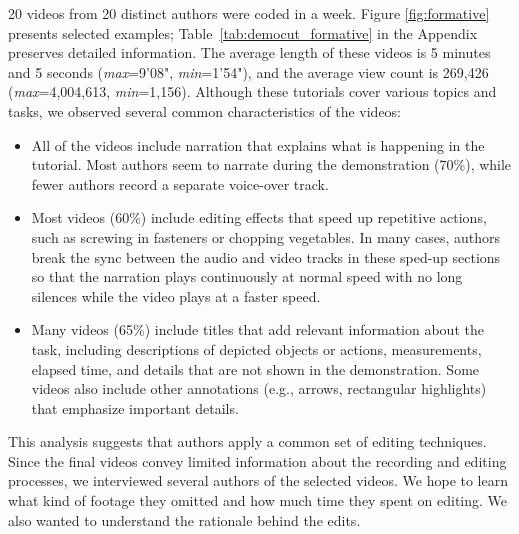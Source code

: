 20 videos from 20 distinct authors were coded in a week. Figure \ref{fig:formative} presents selected examples; Table~\ref{tab:democut_formative} in the Appendix preserves detailed information.
The average length of these videos is 5 minutes and 5 seconds (\emph{max}=9'08",
\emph{min}=1'54"), and the average view count is 269,426
(\emph{max}=4,004,613, \emph{min}=1,156). Although these tutorials
cover various topics and tasks, we observed several common
characteristics of the videos:

\begin{itemize}
  \setlength{\itemsep}{0pt}

\item {} All of the videos include narration that
  explains what is happening in the tutorial. Most authors seem to
  narrate during the demonstration (70\%), while fewer authors record a
  separate voice-over track.

\item {} Most videos (60\%) include editing
  effects that speed up repetitive actions, such as screwing in
  fasteners or chopping vegetables. In many cases, authors break the
  sync between the audio and video tracks in these sped-up sections so
  that the narration plays continuously at normal speed with no long
  silences while the video plays at a faster speed.

\item {} Many videos (65\%) include titles
  that add relevant information about the task, including descriptions
  of depicted objects or actions, measurements, elapsed time, and
  details that are not shown in the demonstration. Some videos also
  include other annotations (e.g., arrows, rectangular highlights)
  that emphasize important details.

\end{itemize}

This analysis suggests that authors apply a common set of editing
techniques. Since the final videos convey limited information
about the recording and editing processes, we
interviewed several authors of the selected videos.
We hope to learn what kind of footage they omitted and how much time they spent on editing. We also wanted to understand the rationale behind the edits.


